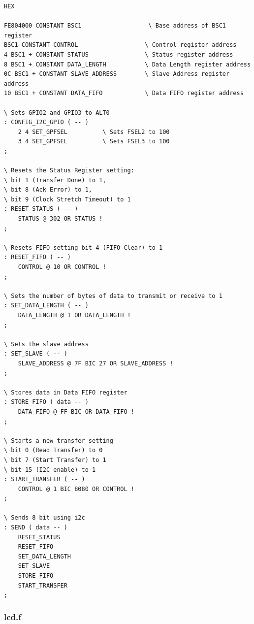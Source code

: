 \documentclass[]{article}
\begin{document}
\begin{verbatim}
HEX

FE804000 CONSTANT BSC1                   \ Base address of BSC1 register
BSC1 CONSTANT CONTROL                   \ Control register address
4 BSC1 + CONSTANT STATUS                \ Status register address
8 BSC1 + CONSTANT DATA_LENGTH           \ Data Length register address
0C BSC1 + CONSTANT SLAVE_ADDRESS        \ Slave Address register address
10 BSC1 + CONSTANT DATA_FIFO            \ Data FIFO register address

\ Sets GPIO2 and GPIO3 to ALT0
: CONFIG_I2C_GPIO ( -- )
    2 4 SET_GPFSEL          \ Sets FSEL2 to 100
    3 4 SET_GPFSEL          \ Sets FSEL3 to 100 
;

\ Resets the Status Register setting:
\ bit 1 (Transfer Done) to 1,
\ bit 8 (Ack Error) to 1,
\ bit 9 (Clock Stretch Timeout) to 1
: RESET_STATUS ( -- )
    STATUS @ 302 OR STATUS !
;

\ Resets FIFO setting bit 4 (FIFO Clear) to 1
: RESET_FIFO ( -- )
    CONTROL @ 10 OR CONTROL !
;

\ Sets the number of bytes of data to transmit or receive to 1
: SET_DATA_LENGTH ( -- )
    DATA_LENGTH @ 1 OR DATA_LENGTH !
;

\ Sets the slave address 
: SET_SLAVE ( -- )
    SLAVE_ADDRESS @ 7F BIC 27 OR SLAVE_ADDRESS !
;

\ Stores data in Data FIFO register
: STORE_FIFO ( data -- )
    DATA_FIFO @ FF BIC OR DATA_FIFO !
;

\ Starts a new transfer setting 
\ bit 0 (Read Transfer) to 0
\ bit 7 (Start Transfer) to 1 
\ bit 15 (I2C enable) to 1 
: START_TRANSFER ( -- )
    CONTROL @ 1 BIC 8080 OR CONTROL !
;

\ Sends 8 bit using i2c
: SEND ( data -- )
    RESET_STATUS 
    RESET_FIFO
    SET_DATA_LENGTH
    SET_SLAVE
    STORE_FIFO
    START_TRANSFER
;

\end{verbatim}

\subsubsection{lcd.f}
\end{document}
